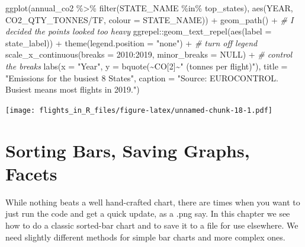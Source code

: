 \documentclass[
]{book}
\newenvironment{Shaded}{\begin{snugshade}}{\end{snugshade}}
\newcommand{\AttributeTok}[1]{\textcolor[rgb]{0.77,0.63,0.00}{#1}}
\newcommand{\CommentTok}[1]{\textcolor[rgb]{0.56,0.35,0.01}{\textit{#1}}}
\newcommand{\ConstantTok}[1]{\textcolor[rgb]{0.00,0.00,0.00}{#1}}
\newcommand{\DecValTok}[1]{\textcolor[rgb]{0.00,0.00,0.81}{#1}}
\newcommand{\FunctionTok}[1]{\textcolor[rgb]{0.00,0.00,0.00}{#1}}
\newcommand{\NormalTok}[1]{#1}
\newcommand{\SpecialCharTok}[1]{\textcolor[rgb]{0.00,0.00,0.00}{#1}}
\newcommand{\StringTok}[1]{\textcolor[rgb]{0.31,0.60,0.02}{#1}}
\begin{document}
\begin{Shaded}
\begin{Highlighting}[]
\FunctionTok{ggplot}\NormalTok{(annual\_co2 }\SpecialCharTok{\%\textgreater{}\%} 
         \FunctionTok{filter}\NormalTok{(STATE\_NAME }\SpecialCharTok{\%in\%}\NormalTok{ top\_states), }
       \FunctionTok{aes}\NormalTok{(YEAR, CO2\_QTY\_TONNES}\SpecialCharTok{/}\NormalTok{TF, }
           \AttributeTok{colour =}\NormalTok{ STATE\_NAME)) }\SpecialCharTok{+}
  \FunctionTok{geom\_path}\NormalTok{() }\SpecialCharTok{+} \CommentTok{\# I decided the points looked too heavy}
\NormalTok{  ggrepel}\SpecialCharTok{::}\FunctionTok{geom\_text\_repel}\NormalTok{(}\FunctionTok{aes}\NormalTok{(}\AttributeTok{label =}\NormalTok{ state\_label)) }\SpecialCharTok{+}
  \FunctionTok{theme}\NormalTok{(}\AttributeTok{legend.position =} \StringTok{"none"}\NormalTok{) }\SpecialCharTok{+}  \CommentTok{\# turn off legend}
  \FunctionTok{scale\_x\_continuous}\NormalTok{(}\AttributeTok{breaks =} \DecValTok{2010}\SpecialCharTok{:}\DecValTok{2019}\NormalTok{, }\AttributeTok{minor\_breaks =} \ConstantTok{NULL}\NormalTok{) }\SpecialCharTok{+} \CommentTok{\# control the breaks}
  \FunctionTok{labs}\NormalTok{(}\AttributeTok{x =} \StringTok{"Year"}\NormalTok{, }
       \AttributeTok{y =} \FunctionTok{bquote}\NormalTok{(}\SpecialCharTok{\textasciitilde{}}\NormalTok{CO[}\DecValTok{2}\NormalTok{]}\SpecialCharTok{\textasciitilde{}}\StringTok{" (tonnes per flight)"}\NormalTok{),}
       \AttributeTok{title =} \StringTok{"Emissions for the busiest 8 States"}\NormalTok{,}
       \AttributeTok{caption =} \StringTok{"Source: EUROCONTROL. \textquotesingle{}Busiest\textquotesingle{} means most flights in 2019."}\NormalTok{)}
\end{Highlighting}
\end{Shaded}

\texttt{[image: flights\_in\_R\_files/figure-latex/unnamed-chunk-18-1.pdf]}

\hypertarget{sorting-bars-saving-graphs-facets}{%
\chapter{Sorting Bars, Saving Graphs, Facets}\label{sorting-bars-saving-graphs-facets}}

While nothing beats a well hand-crafted chart, there are times when you want to just run the code and get a quick update, as a .png say. In this chapter we see how to do a classic sorted-bar chart and to save it to a file for use elsewhere. We need slightly different methods for simple bar charts and more complex ones.
\end{document}
